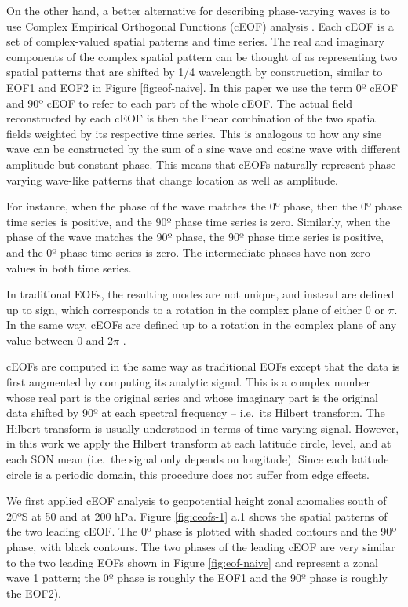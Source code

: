 \documentclass[pdflatex,lineno,sn-basic]{sn-jnl}
\theoremstyle{thmstyleone}%
\theoremstyle{thmstyletwo}%
\theoremstyle{thmstylethree}%
\begin{document}
On the other hand, a better alternative for describing phase-varying waves is to use Complex Empirical Orthogonal Functions (cEOF) analysis \citep{horel1984}.
Each cEOF is a set of complex-valued spatial patterns and time series.
The real and imaginary components of the complex spatial pattern can be thought of as representing two spatial patterns that are shifted by 1/4 wavelength by construction, similar to EOF1 and EOF2 in Figure \ref{fig:eof-naive}.
In this paper we use the term 0º cEOF and 90º cEOF to refer to each part of the whole cEOF.
The actual field reconstructed by each cEOF is then the linear combination of the two spatial fields weighted by its respective time series.
This is analogous to how any sine wave can be constructed by the sum of a sine wave and cosine wave with different amplitude but constant phase.
This means that cEOFs naturally represent phase-varying wave-like patterns that change location as well as amplitude.

For instance, when the phase of the wave matches the 0º phase, then the 0º phase time series is positive, and the 90º phase time series is zero.
Similarly, when the phase of the wave matches the 90º phase, the 90º phase time series is positive, and the 0º phase time series is zero.
The intermediate phases have non-zero values in both time series.

In traditional EOFs, the resulting modes are not unique, and instead are defined up to sign, which corresponds to a rotation in the complex plane of either 0 or \(\pi\).
In the same way, cEOFs are defined up to a rotation in the complex plane of any value between 0 and \(2\pi\) \citep{horel1984}.

cEOFs are computed in the same way as traditional EOFs except that the data is first augmented by computing its analytic signal.
This is a complex number whose real part is the original series and whose imaginary part is the original data shifted by 90º at each spectral frequency -- i.e.~its Hilbert transform.
The Hilbert transform is usually understood in terms of time-varying signal.
However, in this work we apply the Hilbert transform at each latitude circle, level, and at each SON mean (i.e.~the signal only depends on longitude).
Since each latitude circle is a periodic domain, this procedure does not suffer from edge effects.

We first applied cEOF analysis to geopotential height zonal anomalies south of 20ºS at 50 and at 200 hPa.
Figure \ref{fig:ceofs-1} a.1 shows the spatial patterns of the two leading cEOF.
The 0º phase is plotted with shaded contours and the 90º phase, with black contours.
The two phases of the leading cEOF are very similar to the two leading EOFs shown in Figure \ref{fig:eof-naive} and represent a zonal wave 1 pattern; the 0º phase is roughly the EOF1 and the 90º phase is roughly the EOF2).
\end{document}
